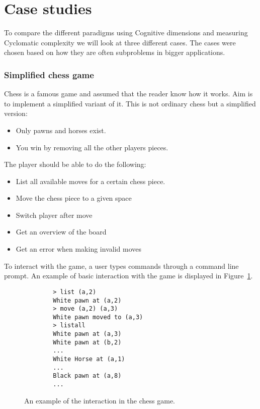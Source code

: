 \documentclass[12pt]{report}
\theoremstyle{definition}
\theoremstyle{theorem}
\begin{document}
\section{Case studies}

To compare the different paradigms using Cognitive dimensions and measuring
Cyclomatic complexity we will look at three different cases. The cases were
chosen based on how they are often subproblems in bigger applications.

\subsubsection*{Simplified chess game}

Chess is a famous game and assumed that the reader know how it works. Aim
is to implement a simplified variant of it. This is not ordinary chess but a
simplified version:

\begin{itemize} 
    \item Only pawns and horses exist.
    \item You win by removing all the other players pieces.
\end{itemize}

The player should be able to do the following:

\begin{itemize} 
    \item List all available moves for a certain chess piece. 
    \item Move the chess piece to a given space
    \item Switch player after move
    \item Get an overview of the board
    \item Get an error when making invalid moves
\end{itemize}

To interact with the game, a user types commands through a command line prompt.
An example of basic interaction with the game is displayed in
Figure~\ref{chessexample}.

\begin{figure}[H]
    \centering
    \begin{lstlisting}
        > list (a,2)
        White pawn at (a,2)
        > move (a,2) (a,3)
        White pawn moved to (a,3)
        > listall
        White pawn at (a,3)
        White pawn at (b,2)
        ...
        White Horse at (a,1)
        ...
        Black pawn at (a,8)
        ...
    \end{lstlisting}
    \label{chessexample}
    \caption{An example of the interaction in the chess game.}
\end{figure}
\end{document}
